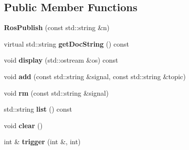 \subsection*{Public Member Functions}
\begin{DoxyCompactItemize}
\item 
{\bfseries Ros\+Publish} (const std\+::string \&n)\hypertarget{classdynamic__graph_1_1RosPublish_a096779c4bfebb42570b99522a0080cd7}{}\label{classdynamic__graph_1_1RosPublish_a096779c4bfebb42570b99522a0080cd7}

\item 
virtual std\+::string {\bfseries get\+Doc\+String} () const \hypertarget{classdynamic__graph_1_1RosPublish_a0e0678abe0a8daf396cb979f7b36fdc7}{}\label{classdynamic__graph_1_1RosPublish_a0e0678abe0a8daf396cb979f7b36fdc7}

\item 
void {\bfseries display} (std\+::ostream \&os) const \hypertarget{classdynamic__graph_1_1RosPublish_a31a960cdd57d1627cbd192ae179132a0}{}\label{classdynamic__graph_1_1RosPublish_a31a960cdd57d1627cbd192ae179132a0}

\item 
void {\bfseries add} (const std\+::string \&signal, const std\+::string \&topic)\hypertarget{classdynamic__graph_1_1RosPublish_ad0e751d0df273d7b35a39802cfd2e2f4}{}\label{classdynamic__graph_1_1RosPublish_ad0e751d0df273d7b35a39802cfd2e2f4}

\item 
void {\bfseries rm} (const std\+::string \&signal)\hypertarget{classdynamic__graph_1_1RosPublish_acfc49e5212dc48c7623b10d4b48be8ad}{}\label{classdynamic__graph_1_1RosPublish_acfc49e5212dc48c7623b10d4b48be8ad}

\item 
std\+::string {\bfseries list} () const \hypertarget{classdynamic__graph_1_1RosPublish_a26a60355631c7df2364cbb7f8309c467}{}\label{classdynamic__graph_1_1RosPublish_a26a60355631c7df2364cbb7f8309c467}

\item 
void {\bfseries clear} ()\hypertarget{classdynamic__graph_1_1RosPublish_a3e6ddd8230db25e46874193b81f31715}{}\label{classdynamic__graph_1_1RosPublish_a3e6ddd8230db25e46874193b81f31715}

\item 
int \& {\bfseries trigger} (int \&, int)\hypertarget{classdynamic__graph_1_1RosPublish_aedf99adaa287e141875b3061c2699c64}{}\label{classdynamic__graph_1_1RosPublish_aedf99adaa287e141875b3061c2699c64}


\end{DoxyCompactItemize}
